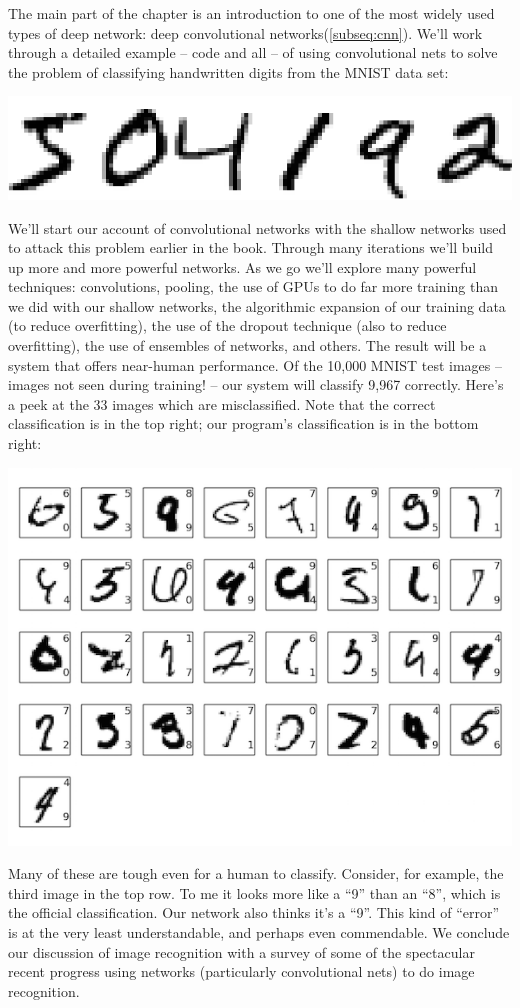 \documentclass[a4paper,twoside,10pt]{book}
\begin{document}
The main part of the chapter is an introduction to one of the most widely used types of deep network: deep convolutional networks(\ref{subseq:cnn}). We'll work through a detailed example -- code and all -- of using convolutional nets to solve the problem of classifying handwritten digits from the MNIST data set:
\begin{center}
	\includegraphics[width=0.4\linewidth]{figures/ch1/digits}
\end{center}
We'll start our account of convolutional networks with the shallow networks used to attack this problem earlier in the book. Through many iterations we'll build up more and more powerful networks. As we go we'll explore many powerful techniques: convolutions, pooling, the use of GPUs to do far more training than we did with our shallow networks, the algorithmic expansion of our training data (to reduce overfitting), the use of the dropout technique (also to reduce overfitting), the use of ensembles of networks, and others. The result will be a system that offers near-human performance. Of the 10,000 MNIST test images -- images not seen during training! -- our system will classify 9,967 correctly. Here's a peek at the 33 images which are misclassified. Note that the correct classification is in the top right; our program's classification is in the bottom right:
\begin{center}
	\includegraphics[width=0.85\linewidth]{figures/ch6/ensemble_errors}
\end{center}
Many of these are tough even for a human to classify. Consider, for example, the third image in the top row. To me it looks more like a ``9'' than an ``8'', which is the official classification. Our network also thinks it's a ``9''. This kind of ``error'' is at the very least understandable, and perhaps even commendable. We conclude our discussion of image recognition with a survey of some of the spectacular recent progress using networks (particularly convolutional nets) to do image recognition.
\end{document}
